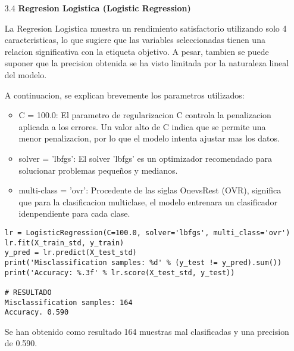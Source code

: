 \documentclass{article}
\begin{document}
\begin{itemize}

\item[3.4]  {\bf Regresion Logistica (Logistic Regression)}

La Regresion Logistica muestra un rendimiento satisfactorio utilizando solo 4 caracteristicas, lo que sugiere que las variables seleccionadas tienen una relacion significativa con la etiqueta objetivo. A pesar, tambien se puede suponer que la precision obtenida se ha visto limitada por la naturaleza lineal del modelo.

A continuacion, se explican brevemente los parametros utilizados:

\begin{itemize}

\item
C = 100.0: El parametro de regularizacion C controla la penalizacion aplicada a los errores. Un valor alto de C indica que se permite una menor penalizacion, por lo que el modelo intenta ajustar mas los datos.

\item
solver = 'lbfgs': El solver 'lbfgs' es un optimizador recomendado para solucionar problemas pequeños y medianos.

\item
multi-class = 'ovr': Procedente de las siglas OnevsRest (OVR), significa que para la
clasificacion multiclase, el modelo entrenara un clasificador idenpendiente para cada 
clase.

\end{itemize}

\begin{tcolorbox}[width=14cm]
\begin{scriptsize}
\begin{verbatim}
lr = LogisticRegression(C=100.0, solver='lbfgs', multi_class='ovr')
lr.fit(X_train_std, y_train)
y_pred = lr.predict(X_test_std)
print('Misclassification samples: %d' % (y_test != y_pred).sum())
print('Accuracy: %.3f' % lr.score(X_test_std, y_test))

# RESULTADO
Misclassification samples: 164
Accuracy. 0.590
\end{verbatim}
\end{scriptsize}
\end{tcolorbox}

Se han obtenido como resultado 164 muestras mal clasificadas y una precision de 0.590.

\end{itemize}
\end{document}
